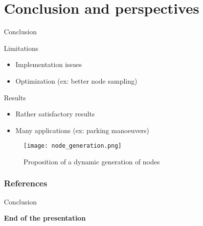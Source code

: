 \documentclass[pdftex,beamer]{beamer}
\theoremstyle{definition}
\theoremstyle{example}
\theoremstyle{plain}
\begin{document}
\section{Conclusion and perspectives}

\begin{frame}{Conclusion}
  \begin{minipage}{0.49\textwidth}
    
    \begin{alertblock}{Limitations}
      \begin{itemize}
        \item Implementation issues
        \item Optimization (ex: better node sampling)
      \end{itemize}
    \end{alertblock}
    
    \begin{exampleblock}{Results}
      \begin{itemize}
        \item Rather satisfactory results
        \item Many applications (ex: parking manoeuvers)
      \end{itemize}
    \end{exampleblock}

  \end{minipage}
  \begin{minipage}{0.5\textwidth}
    \hfill
    \begin{figure}[H]
      \centering
      \texttt{[image: node\_generation.png]}
      \caption{Proposition of a dynamic generation of nodes}
      \label{fig:node_generation}
    \end{figure}
  \end{minipage}
\end{frame}

\begin{frame}[allowframebreaks]
  \frametitle{References}
  \nocite{*}
  
  
\end{frame}

\begin{frame}{Conclusion}
  \begin{center}
    \Huge \textbf{End of the presentation}
  \end{center}
\end{frame}
\end{document}

